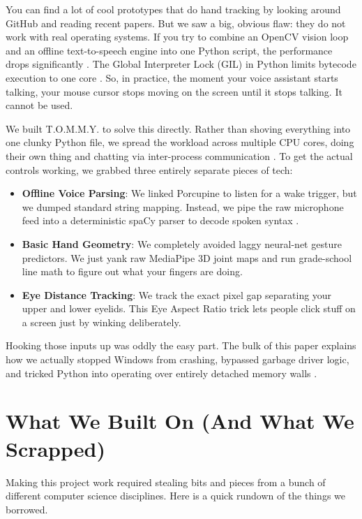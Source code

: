 \documentclass[conference]{IEEEtran}
\begin{document}
You can find a lot of cool prototypes that do hand tracking by looking around GitHub and reading recent papers. But we saw a big, obvious flaw: they do not work with real operating systems. If you try to combine an OpenCV vision loop and an offline text-to-speech engine into one Python script, the performance drops significantly \cite{b9}. The Global Interpreter Lock (GIL) in Python limits bytecode execution to one core \cite{b5}. So, in practice, the moment your voice assistant starts talking, your mouse cursor stops moving on the screen until it stops talking. It cannot be used.

We built T.O.M.M.Y. to solve this directly. Rather than shoving everything into one clunky Python file, we spread the workload across multiple CPU cores, doing their own thing and chatting via inter-process communication \cite{b4}. To get the actual controls working, we grabbed three entirely separate pieces of tech:
\begin{itemize}
    \item \textbf{Offline Voice Parsing}: We linked Porcupine \cite{b15} to listen for a wake trigger, but we dumped standard string mapping. Instead, we pipe the raw microphone feed into a deterministic spaCy parser to decode spoken syntax \cite{b23}.
    \item \textbf{Basic Hand Geometry}: We completely avoided laggy neural-net gesture predictors. We just yank raw MediaPipe 3D joint maps \cite{b16} and run grade-school line math to figure out what your fingers are doing.
    \item \textbf{Eye Distance Tracking}: We track the exact pixel gap separating your upper and lower eyelids. This Eye Aspect Ratio \cite{b11} trick lets people click stuff on a screen just by winking deliberately.
\end{itemize}

Hooking those inputs up was oddly the easy part. The bulk of this paper explains how we actually stopped Windows from crashing, bypassed garbage driver logic, and tricked Python into operating over entirely detached memory walls \cite{b10}. 


\section{What We Built On (And What We Scrapped)}

Making this project work required stealing bits and pieces from a bunch of different computer science disciplines. Here is a quick rundown of the things we borrowed.
\end{document}
